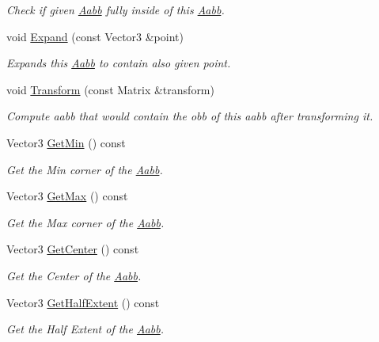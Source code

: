 \begin{DoxyCompactItemize}
\begin{DoxyCompactList}\small\item\em Check if given \hyperlink{classAabb}{Aabb} fully inside of this \hyperlink{classAabb}{Aabb}. \end{DoxyCompactList}\item 
void \hyperlink{classAabb_ac21813c88f72a56e142c984c3efde368}{Expand} (const Vector3 \&point)
\begin{DoxyCompactList}\small\item\em Expands this \hyperlink{classAabb}{Aabb} to contain also given point. \end{DoxyCompactList}\item 
void \hyperlink{classAabb_ace74b981085cccf12e3ff8e8640a0e07}{Transform} (const Matrix \&transform)
\begin{DoxyCompactList}\small\item\em Compute aabb that would contain the obb of this aabb after transforming it. \end{DoxyCompactList}\item 
Vector3 \hyperlink{classAabb_afe9a77744c815785d6b3c6fa4c3a8340}{Get\+Min} () const
\begin{DoxyCompactList}\small\item\em Get the Min corner of the \hyperlink{classAabb}{Aabb}. \end{DoxyCompactList}\item 
Vector3 \hyperlink{classAabb_ad221f8c84e946375de4c07bdef67e157}{Get\+Max} () const
\begin{DoxyCompactList}\small\item\em Get the Max corner of the \hyperlink{classAabb}{Aabb}. \end{DoxyCompactList}\item 
Vector3 \hyperlink{classAabb_a22fbf825e411bdcbf24c277f1f266d0c}{Get\+Center} () const
\begin{DoxyCompactList}\small\item\em Get the Center of the \hyperlink{classAabb}{Aabb}. \end{DoxyCompactList}\item 
Vector3 \hyperlink{classAabb_a06b1e4e71b018b2e5969f49b460f8ae0}{Get\+Half\+Extent} () const
\begin{DoxyCompactList}\small\item\em Get the Half Extent of the \hyperlink{classAabb}{Aabb}. \end{DoxyCompactList}\end{DoxyCompactItemize}
